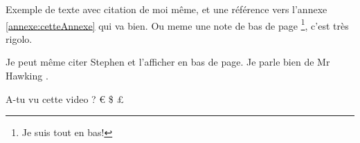 Exemple de texte avec citation \autocite{ref1} de moi même, et une référence vers l'annexe \ref{annexe:cetteAnnexe} qui va bien.
Ou meme une note de bas de page \footnote{Je suis tout en bas!}, c'est très rigolo.

Je peut même citer Stephen \autocite{ref0} et l'afficher en bas de page. Je parle bien de Mr Hawking \autocite{ref0} .

A-tu vu cette video \autocite{ref2} ? € \$ £